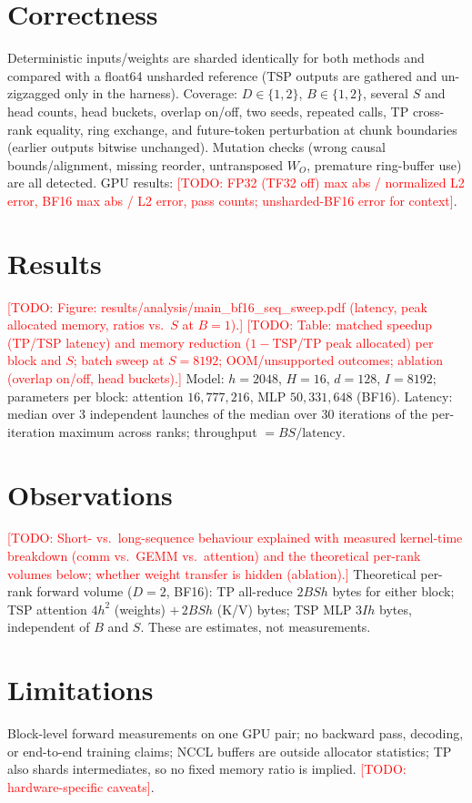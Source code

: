 \documentclass[10pt]{article}
\newcommand{\TODO}[1]{\textcolor{red}{[TODO: #1]}}
\begin{document}
\section{Correctness}
Deterministic inputs/weights are sharded identically for both methods and compared with a float64
unsharded reference (TSP outputs are gathered and un-zigzagged only in the harness). Coverage: $D\in\{1,2\}$,
$B\in\{1,2\}$, several $S$ and head counts, head buckets, overlap on/off, two seeds, repeated calls,
TP cross-rank equality, ring exchange, and future-token perturbation at chunk boundaries (earlier
outputs bitwise unchanged). Mutation checks (wrong causal bounds/alignment, missing reorder, untransposed
$W_O$, premature ring-buffer use) are all detected. GPU results: \TODO{FP32 (TF32 off) max abs / normalized
L2 error, BF16 max abs / L2 error, pass counts; unsharded-BF16 error for context}.

\section{Results}
\TODO{Figure: results/analysis/main\_bf16\_seq\_sweep.pdf (latency, peak allocated memory, ratios vs.\ $S$ at $B{=}1$).}
\TODO{Table: matched speedup (TP/TSP latency) and memory reduction ($1-$TSP/TP peak allocated) per block and $S$; batch sweep at $S{=}8192$; OOM/unsupported outcomes; ablation (overlap on/off, head buckets).}
Model: $h{=}2048$, $H{=}16$, $d{=}128$, $I{=}8192$; parameters per block: attention $16{,}777{,}216$, MLP $50{,}331{,}648$
(BF16). Latency: median over 3 independent launches of the median over 30 iterations of the per-iteration
maximum across ranks; throughput $=BS/\text{latency}$.

\section{Observations}
\TODO{Short- vs.\ long-sequence behaviour explained with measured kernel-time breakdown (comm vs.\ GEMM vs.\ attention) and the theoretical per-rank volumes below; whether weight transfer is hidden (ablation).}
Theoretical per-rank forward volume ($D{=}2$, BF16): TP all-reduce $2BSh$ bytes for either block; TSP attention $4h^2$
(weights) $+\,2BSh$ (K/V) bytes; TSP MLP $3Ih$ bytes, independent of $B$ and $S$. These are estimates, not measurements.

\section{Limitations}
Block-level forward measurements on one GPU pair; no backward pass, decoding, or end-to-end training
claims; NCCL buffers are outside allocator statistics; TP also shards intermediates, so no fixed memory
ratio is implied. \TODO{hardware-specific caveats}.
\end{document}
